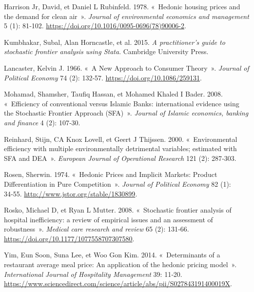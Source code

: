 \documentclass[
  12pt,
]{report}
\newlength{\cslhangindent}
\newenvironment{CSLReferences}[2] %
 {\begin{list}{}{%
  \setlength{\itemindent}{0pt}
  \setlength{\leftmargin}{0pt}
  \setlength{\parsep}{0pt}
  \ifodd #1
   \setlength{\leftmargin}{\cslhangindent}
   \setlength{\itemindent}{-1\cslhangindent}
  \fi
  \setlength{\itemsep}{#2\baselineskip}}}
 {\end{list}}
\begin{document}
\begin{CSLReferences}{1}{0}
Harrison Jr, David, et Daniel L Rubinfeld. 1978. {«~Hedonic housing
prices and the demand for clean air~»}. \emph{Journal of environmental
economics and management} 5 (1): 81‑102.
\url{https://doi.org/10.1016/0095-0696(78)90006-2}.

Kumbhakar, Subal, Alan Horncastle, et al. 2015. \emph{A practitioner's
guide to stochastic frontier analysis using Stata}. Cambridge University
Press.

Lancaster, Kelvin J. 1966. {«~A New Approach to Consumer Theory~»}.
\emph{Journal of Political Economy} 74 (2): 132‑57.
\url{https://doi.org/10.1086/259131}.

Mohamad, Shamsher, Taufiq Hassan, et Mohamed Khaled I Bader. 2008.
{«~Efficiency of conventional versus Islamic Banks: international
evidence using the Stochastic Frontier Approach (SFA)~»}. \emph{Journal
of Islamic economics, banking and finance} 4 (2): 107‑30.

Reinhard, Stijn, CA Knox Lovell, et Geert J Thijssen. 2000.
{«~Environmental efficiency with multiple environmentally detrimental
variables; estimated with SFA and DEA~»}. \emph{European Journal of
Operational Research} 121 (2): 287‑303.

Rosen, Sherwin. 1974. {«~Hedonic Prices and Implicit Markets: Product
Differentiation in Pure Competition~»}. \emph{Journal of Political
Economy} 82 (1): 34‑55. \url{http://www.jstor.org/stable/1830899}.

Rosko, Michael D, et Ryan L Mutter. 2008. {«~Stochastic frontier
analysis of hospital inefficiency: a review of empirical issues and an
assessment of robustness~»}. \emph{Medical care research and review} 65
(2): 131‑66. \url{https://doi.org/10.1177/1077558707307580}.

Yim, Eun Soon, Suna Lee, et Woo Gon Kim. 2014. {«~Determinants of a
restaurant average meal price: An application of the hedonic pricing
model~»}. \emph{International Journal of Hospitality Management} 39:
11‑20.
\url{https://www.sciencedirect.com/science/article/abs/pii/S027843191400019X}.

\end{CSLReferences}
\end{document}
